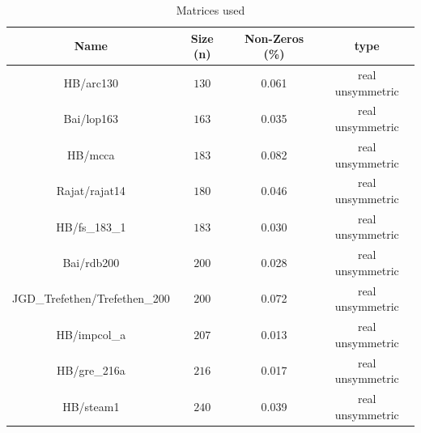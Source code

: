 \documentclass[twoside]{article}
\begin{document}
\begin{table}[ht]
  \caption{Matrices used} %
  \centering %
  \begin{tabular}{c c c c} %
    \hline\hline %
    Name & Size (n)& Non-Zeros (\%) & type \\ [0.5ex] %
    \hline %
    HB/arc130 & $130$ & 0.061 & real unsymmetric \\ %
    Bai/lop163 & $163$ & 0.035 & real unsymmetric  \\
    HB/mcca & $183$ & 0.082 & real unsymmetric  \\
    Rajat/rajat14 & $180$ & 0.046 & real unsymmetric  \\
    HB/fs_183_1 & $183$ & 0.030 & real unsymmetric  \\
    Bai/rdb200 & $200$ & 0.028 & real unsymmetric  \\
    JGD_Trefethen/Trefethen_200 & $200$ & 0.072 & real unsymmetric  \\
    HB/impcol_a & $207$ & 0.013 & real unsymmetric  \\
    HB/gre_216a & $216$ & 0.017 & real unsymmetric  \\
    HB/steam1 & $240$ & 0.039 & real unsymmetric  \\ [1ex] %
    \hline %
  \end{tabular}
  \label{table:nonlin} %
\end{table}


\end{document}
